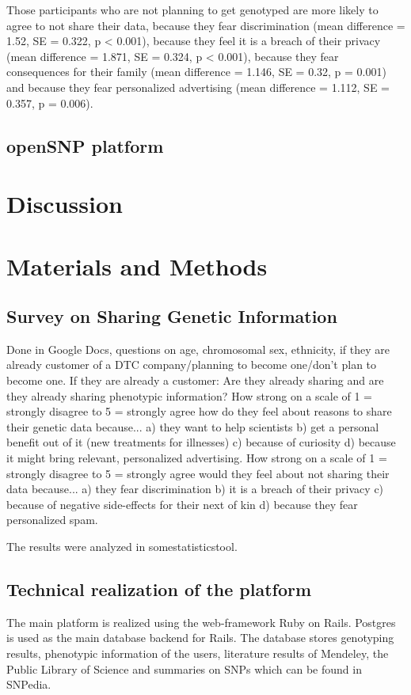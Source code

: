 \documentclass[10pt]{article}
\begin{document}
Those participants who are not planning to get genotyped are more likely to agree to not share their data, because they fear discrimination (mean difference = 1.52, SE = 0.322, p < 0.001), because they feel it is a breach of their privacy (mean difference = 1.871, SE = 0.324, p < 0.001), because they fear consequences for their family (mean difference = 1.146, SE = 0.32, p = 0.001) and because they fear personalized advertising (mean difference =  1.112, SE = 0.357, p = 0.006). 
\subsection*{openSNP platform}


\section*{Discussion}

\section*{Materials and Methods}
\subsection*{Survey on Sharing Genetic Information}
Done in Google Docs, questions on age, chromosomal sex, ethnicity, if they are already customer of a DTC company/planning to become one/don't plan to become one. If they are already a customer: Are they already sharing and are they already sharing phenotypic information? How strong on a scale of 1 = strongly disagree to  5 = strongly agree how do they feel about reasons to share their genetic data because... a) they want to help scientists b) get a personal benefit out of it (new treatments for illnesses) c) because of curiosity d) because it might bring relevant, personalized advertising. How strong on a scale of 1 = strongly disagree to 5 = strongly agree would they feel about not sharing their data because... a) they fear discrimination b) it is a breach of their privacy c) because of negative side-effects for their next of kin d) because they fear personalized spam. 

The results were analyzed in somestatisticstool. 

\subsection*{Technical realization of the platform}
The main platform is realized using the web-framework Ruby on Rails. Postgres is used as the main database backend for Rails. The database stores genotyping results, phenotypic information of the users, literature results of Mendeley, the Public Library of Science and summaries on SNPs which can be found in SNPedia. 
\end{document}
